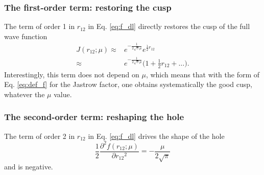 \documentclass[aip,jcp,reprint,noshowkeys,superscriptaddress]{revtex4-1}
\newcommand{\deriv}[3]{\frac{\partial^{#3} #1}{\partial {#2}^{#3}}}
\begin{document}
\subsubsection{The first-order term: restoring the cusp}
The term of order 1 in $r_{12}$ in Eq. \eqref{eq:f_dl} directly restores the cusp of the full wave function
\begin{equation}
 \begin{aligned}
  J(r_{12};\mu) \approx  & e^{-\frac{1}{2\sqrt{\pi}\mu}} e^{\frac{1}{2}r_{12}} \\
                \approx  & e^{-\frac{1}{2\sqrt{\pi}\mu}} \bigg( 1 + \frac{1}{2} r_{12} + \hdots \bigg).
 \end{aligned}
\end{equation}
Interestingly, this term does not depend on $\mu$, which means that with the form of Eq. \eqref{eq:def_f} for the Jastrow factor, one obtains systematically the good cusp, whatever the $\mu$ value. 

\subsubsection{The second-order term: reshaping the hole}
The term of order 2 in $r_{12}$ in Eq. \eqref{eq:f_dl} drives the shape of the hole
\begin{equation}
  \frac{1}{2} \deriv{f(r_{12};\mu)}{r_{12}}{2} = - \frac{\mu}{2\sqrt{\pi}} 
\end{equation}
and is negative. 
\end{document}
